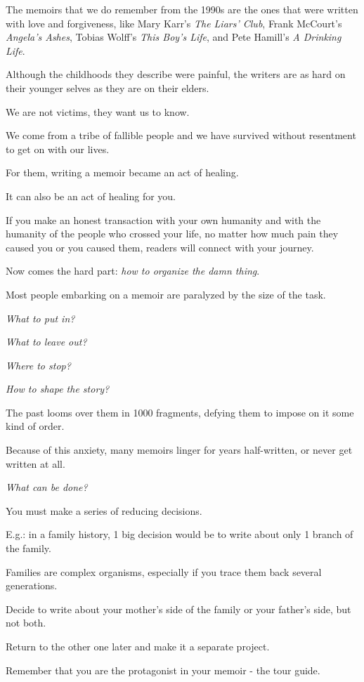 \documentclass{book}
\numberwithin{equation}{section}
\begin{document}
The memoirs that we do remember from the 1990s are the ones that were written with love and forgiveness, like Mary Karr's \textit{The Liars' Club}, Frank McCourt's \textit{Angela's Ashes}, Tobias Wolff's \textit{This Boy's Life}, and Pete Hamill's \textit{A Drinking Life}.

Although the childhoods they describe were painful, the writers are as hard on their younger selves as they are on their elders.

We are not victims, they want us to know.

We come from a tribe of fallible people and we have survived without resentment to get on with our lives.

For them, writing a memoir became an act of healing.

It can also be an act of healing for you.

If you make an honest transaction with your own humanity and with the humanity of the people who crossed your life, no matter how much pain they caused you or you caused them, readers will connect with your journey.

%
Now comes the hard part: \textit{how to organize the damn thing}.

Most people embarking on a memoir are paralyzed by the size of the task.

\textit{What to put in?}

\textit{What to leave out?}

\textit{Where to stop?}

\textit{How to shape the story?}

The past looms over them in 1000 fragments, defying them to impose on it some kind of order.

Because of this anxiety, many memoirs linger for years half-written, or never get written at all.

%
\textit{What can be done?}

%
You must make a series of reducing decisions.

E.g.: in a family history, 1 big decision would be to write about only 1 branch of the family.

Families are complex organisms, especially if you trace them back several generations.

Decide to write about your mother's side of the family or your father's side, but not both.

Return to the other one later and make it a separate project.

%
Remember that you are the protagonist in your memoir - the tour guide.
\end{document}
